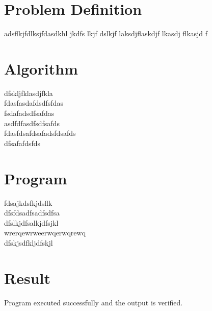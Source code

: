 \section{Problem Definition}
adsflkjfdlksjfdasdkhl jkdfs lkjf dslkjf laksdjflaskdjf lkasdj flkasjd f
\section{Algorithm}
dfskljfklasdjfkla\\
fdasfasdafdsdfsfdas\\
fsdafadsdfsafdas\\
asdfdfasdfsdfsafds\\
fdasfdsafdsafadsfdsafds\\
dfsafafdsfds\\
\section{Program}
fdsajkdsfkjdsflk\\
dfsfdsadfsadfsdfsa\\
dfslkjdfsalkjdfsjkl\\
wrerqewrweerwqerwqrewq\\
dfskjsdfkljdfskjl\\
\section{Result}
Program executed successfully and the output is verified.
